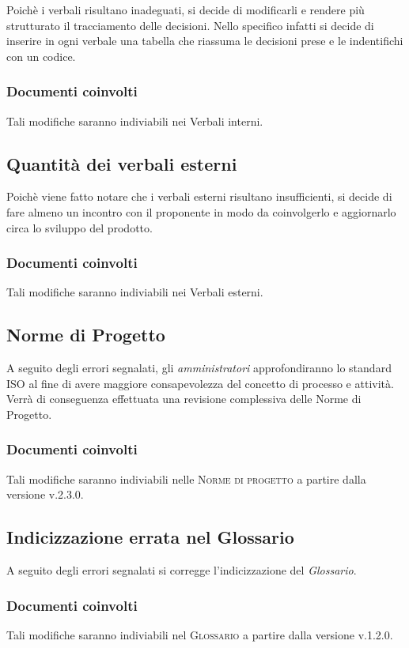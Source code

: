 \documentclass{article}
\begin{document}
Poichè i verbali risultano inadeguati, si decide di modificarli e rendere più strutturato il tracciamento delle decisioni. Nello specifico infatti si decide di inserire
in ogni verbale una tabella che riassuma le decisioni prese e le indentifichi con un codice. 
\subsubsection*{Documenti coinvolti}
Tali modifiche saranno indiviabili nei Verbali interni. 

\subsection{Quantità dei verbali esterni}
\label{itm:6}

Poichè viene fatto notare che i verbali esterni risultano insufficienti, si decide di fare almeno un incontro con il proponente in modo da coinvolgerlo e aggiornarlo circa lo sviluppo del prodotto.
\subsubsection*{Documenti coinvolti}
Tali modifiche saranno indiviabili nei Verbali esterni.

\subsection{Norme di Progetto}
\label{itm:7}

A seguito degli errori segnalati, gli \emph{amministratori} approfondiranno lo standard ISO al fine di avere maggiore consapevolezza del concetto di processo e attività. Verrà di conseguenza
effettuata una revisione complessiva delle Norme di Progetto.
\subsubsection*{Documenti coinvolti}
Tali modifiche saranno indiviabili nelle \textsc{Norme di progetto} a partire dalla versione v.2.3.0.

\subsection{Indicizzazione errata nel Glossario}
\label{itm:7}

A seguito degli errori segnalati si corregge l'indicizzazione del \emph{Glossario}.
\subsubsection*{Documenti coinvolti}
Tali modifiche saranno indiviabili nel \textsc{Glossario} a partire dalla versione v.1.2.0.
\end{document}
